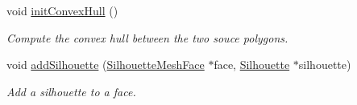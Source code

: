 \begin{DoxyCompactItemize}
\mbox{\label{classvisilib_1_1_silhouette_processor_a75124a633d2221e1fa7218b5eefb09bb}} 
void \mbox{\hyperlink{classvisilib_1_1_silhouette_processor_a75124a633d2221e1fa7218b5eefb09bb}{init\+Convex\+Hull}} ()
\begin{DoxyCompactList}\small\item\em Compute the convex hull between the two souce polygons. \end{DoxyCompactList}\item 
\mbox{\label{classvisilib_1_1_silhouette_processor_aaf5d17542177191ea02b748f88c957be}} 
void \mbox{\hyperlink{classvisilib_1_1_silhouette_processor_aaf5d17542177191ea02b748f88c957be}{add\+Silhouette}} (\mbox{\hyperlink{classvisilib_1_1_silhouette_mesh_face}{Silhouette\+Mesh\+Face}} $\ast$face, \mbox{\hyperlink{classvisilib_1_1_silhouette}{Silhouette}} $\ast$silhouette)
\begin{DoxyCompactList}\small\item\em Add a silhouette to a face. \end{DoxyCompactList}\end{DoxyCompactItemize}
